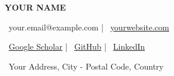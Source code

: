 \begin{center}
  \textbf{\LARGE{Y}\large{OUR} \LARGE{N}\large{AME}}
\end{center}

\vspace{\headerspacing}

\begin{center}
    \small{
    \faEnvelope\ {your.email@example.com} \quad|\quad 
    \faGlobe\ \href{https://www.yourwebsite.com/}{yourwebsite.com}
    }
\end{center}

\vspace{\headerspacing}

\begin{center}
    \small{
    \faGraduationCap\ \href{https://scholar.google.com/citations?user=YOUR_ID}{Google Scholar} \quad|\quad 
    \faGithub\ \href{https://github.com/yourusername}{GitHub} \quad|\quad
    \faLinkedin\ \href{https://www.linkedin.com/in/your-profile/}{LinkedIn}
    }
\end{center}

\vspace{\headerspacing}

\begin{center}
    \small{\faMapMarker\ Your Address, City - Postal Code, Country}
\end{center}